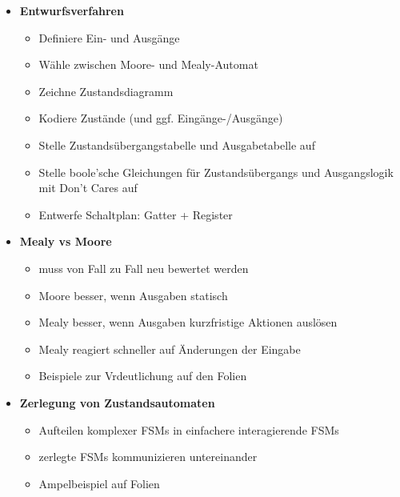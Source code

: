 \begin{itemize}
\begin{itemize}
\item \textbf{Entwurfsverfahren}
	\begin{itemize}
	\item Definiere Ein- und Ausgänge
	\item Wähle zwischen Moore- und Mealy-Automat
	\item Zeichne Zustandsdiagramm
	\item Kodiere Zustände (und ggf. Eingänge-/Ausgänge)
	\item Stelle Zustandsübergangstabelle und Ausgabetabelle auf
	\item Stelle boole'sche Gleichungen für Zustandsübergangs und Ausgangslogik mit Don't Cares auf
	\item Entwerfe Schaltplan: Gatter + Register
	\end{itemize}

\item \textbf{Mealy vs Moore}
	\begin{itemize}
	\item muss von Fall zu Fall neu bewertet werden
	\item Moore besser, wenn Ausgaben statisch
	\item Mealy besser, wenn Ausgaben kurzfristige Aktionen auslösen
	\item Mealy reagiert schneller auf Änderungen der Eingabe
	\item Beispiele zur Vrdeutlichung auf den Folien
	\end{itemize}
	
\item \textbf{Zerlegung von Zustandsautomaten}
	\begin{itemize}
	
	\item Aufteilen komplexer FSMs in einfachere interagierende FSMs
	\item zerlegte FSMs kommunizieren untereinander
	\item Ampelbeispiel auf Folien
	
	\end{itemize}

\end{itemize}
\end{itemize}


